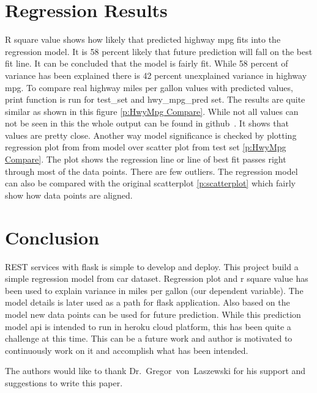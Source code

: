 \section{Regression Results}
 R square value shows how likely that predicted highway mpg fits into the
 regression model. It is 58 percent likely that future prediction will fall
 on the best fit line. It can be concluded that the model is fairly fit. While 
 58 percent of variance has been explained there is 42 percent unexplained
 variance in highway mpg. To compare real highway miles per gallon values with 
 predicted values, print function is
 run for test\_set and hwy\_mpg\_pred set. The results are quite similar as
 shown in this figure \ref{p:HwyMpg Compare}. While not all values can not be seen  
 in this the whole output can be found in github~\cite{hid-sp18-415-analysis}.
 It shows that values are pretty close.
 Another way model significance is checked by plotting regression plot from
 from model over scatter plot from test set \ref{p:HwyMpg Compare}. The plot shows 
 the regression line or line of best fit passes right through most of the data
 points. There are few outliers. The regression model can also be compared with 
 the original scatterplot \ref{p:scatterplot} which fairly show how data points
 are aligned.  
 
  
 
\section{Conclusion}

REST services with flask is simple to develop and deploy. This project build a
simple regression model from car dataset. Regression plot and r square
value has been used to explain variance in miles per gallon (our dependent
variable). The model details is later used as 
a path for flask application. Also based on the model new data points can be used 
for future prediction. While this prediction model api is intended to run in 
heroku cloud platform, this has been quite a challenge at this time. This can 
be a future work and author is motivated to continuously work on it and 
accomplish what has been intended. 



\begin{acks}

  The authors would like to thank Dr.~Gregor~von~Laszewski for his
  support and suggestions to write this paper.

\end{acks}

